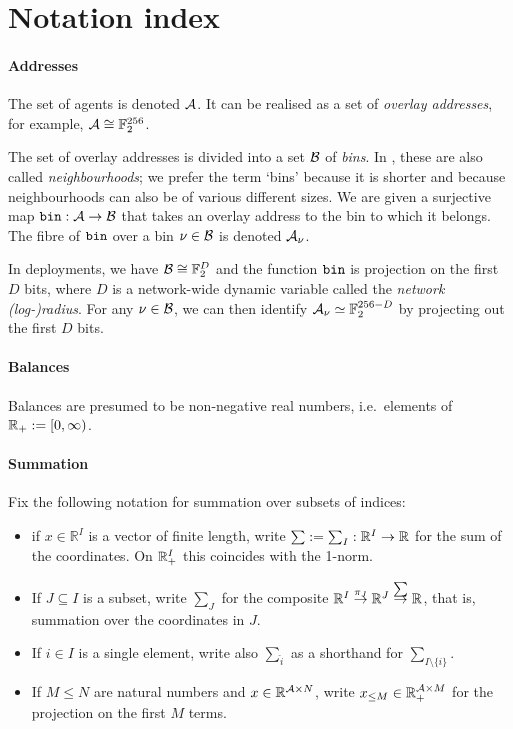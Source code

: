 \appendix

\section{Notation index}

\paragraph{Addresses}

The set of agents is denoted $\mathcal{A}$.
%
It can be realised as a set of \emph{overlay addresses}, for example, $\mathcal{A} \cong \mathbb{F}_2^{256}$.

The set of overlay addresses is divided into a set $\mathcal{B}$ of \emph{bins}.
%
In \cite{book-of-swarm}, these are also called \emph{neighbourhoods}; we prefer the term `bins' because it is shorter and because neighbourhoods can also be of various different sizes.
%
We are given a surjective map $\mathtt{bin}:\mathcal{A}\rightarrow\mathcal{B}$ that takes an overlay address to the bin to which it belongs.
%
The fibre of $\mathtt{bin}$ over a bin $\nu\in\mathcal{B}$ is denoted $\mathcal{A}_\nu$.

In deployments, we have $\mathcal{B}\cong \mathbb{F}_2^D$ and the function $\mathtt{bin}$ is projection on the first $D$ bits, where $D$ is a network-wide dynamic variable called the \emph{network (log-)radius}.
%
For any $\nu\in\mathcal{B}$, we can then identify $\mathcal{A}_\nu\simeq\mathbb{F}_2^{256-D}$ by projecting out the first $D$ bits.


\paragraph{Balances} Balances are presumed to be non-negative real numbers, i.e.~elements of $\mathbb{R}_+ := [0,\infty)$.

\paragraph{Summation}
Fix the following notation for summation over subsets of indices:
\begin{itemize}
  \item if $x\in \mathbb{R}^I$ is a vector of finite length, write $\sum:=\sum_I:\mathbb{R}^I\rightarrow\mathbb{R}$ for the sum of the coordinates. On $\mathbb{R}_+^I$ this coincides with the 1-norm.
  \item If $J\subseteq I$ is a subset, write $\sum_J$ for the composite $\mathbb{R}^I\stackrel{\pi_J}{\rightarrow}\mathbb{R}^J\stackrel{\sum}{\rightarrow}\mathbb{R}$, that is, summation over the coordinates in $J$.
  \item If $i\in I$ is a single element, write also $\sum_{\hat{i}}$ as a shorthand for $\sum_{I\setminus\{i\}}$.
  \item If $M\leq N$ are natural numbers and $x\in\mathbb{R}^{\mathcal{A}\times N}$, write $x_{\leq M}\in \mathbb{R}_+^{\mathcal{A}\times M}$ for the projection on the first $M$ terms.
\end{itemize}


